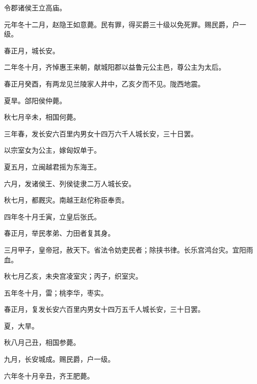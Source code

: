 \documentclass[12pt,UTF8]{ctexbook}
\begin{document}
令郡诸侯王立高庙。



元年冬十二月，赵隐王如意薨。民有罪，得买爵三十级以免死罪。赐民爵，户一级。



春正月，城长安。



二年冬十月，齐悼惠王来朝，献城阳郡以益鲁元公主邑，尊公主为太后。



春正月癸酉，有两龙见兰陵家人井中，乙亥夕而不见。陇西地震。



夏旱。郃阳侯仲薨。



秋七月辛未，相国何薨。



三年春，发长安六百里内男女十四万六千人城长安，三十日罢。



以宗室女为公主，嫁匈奴单于。



夏五月，立闽越君摇为东海王。



六月，发诸侯王、列侯徒隶二万人城长安。



秋七月，都厩灾。南越王赵佗称臣奉贡。



四年冬十月壬寅，立皇后张氏。



春正月，举民孝弟、力田者复其身。



三月甲子，皇帝冠，赦天下。省法令妨吏民者；除挟书律。长乐宫鸿台灾。宜阳雨血。



秋七月乙亥，未央宫凌室灾；丙子，织室灾。



五年冬十月，雷；桃李华，枣实。



春正月，复发长安六百里内男女十四万五千人城长安，三十日罢。



夏，大旱。



秋八月己丑，相国参薨。



九月，长安城成。赐民爵，户一级。



六年冬十月辛丑，齐王肥薨。
\end{document}
